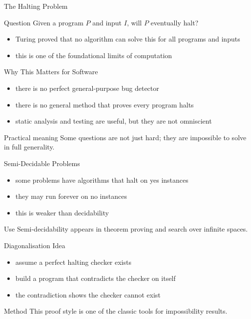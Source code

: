 \documentclass[aspectratio=169,xcolor=dvipsnames]{beamer}
\begin{document}
\begin{frame}{The Halting Problem}
  \begin{alertblock}{Question}
    Given a program $P$ and input $I$, will $P$ eventually halt?
  \end{alertblock}
  \begin{itemize}
    \item Turing proved that no algorithm can solve this for all programs and inputs
    \item this is one of the foundational limits of computation
  \end{itemize}
\end{frame}

\begin{frame}{Why This Matters for Software}
  \begin{itemize}
    \item there is no perfect general-purpose bug detector
    \item there is no general method that proves every program halts
    \item static analysis and testing are useful, but they are not omniscient
  \end{itemize}
  \begin{exampleblock}{Practical meaning}
    Some questions are not just hard; they are impossible to solve in full generality.
  \end{exampleblock}
\end{frame}

\begin{frame}{Semi-Decidable Problems}
  \begin{itemize}
    \item some problems have algorithms that halt on yes instances
    \item they may run forever on no instances
    \item this is weaker than decidability
  \end{itemize}
  \begin{block}{Use}
    Semi-decidability appears in theorem proving and search over infinite spaces.
  \end{block}
\end{frame}

\begin{frame}{Diagonalisation Idea}
  \begin{itemize}
    \item assume a perfect halting checker exists
    \item build a program that contradicts the checker on itself
    \item the contradiction shows the checker cannot exist
  \end{itemize}
  \begin{alertblock}{Method}
    This proof style is one of the classic tools for impossibility results.
  \end{alertblock}
\end{frame}
\end{document}
